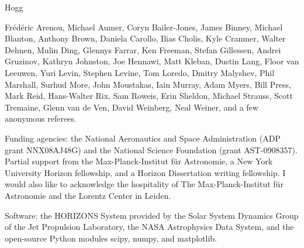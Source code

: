 

Hogg

Fr{\'e}d{\'e}ric Arenou, Michael Aumer, Coryn Bailer-Jones, James
Binney, Michael Blanton, Anthony Brown, Daniela Carollo, Ilias Cholis,
Kyle Cranmer, Walter Dehnen, Mulin Ding, Glennys Farrar, Ken Freeman,
Stefan Gillessen, Andrei Gruzinov, Kathryn Johnston, Joe Hennawi, Matt
Kleban, Dustin Lang, Floor van Leeuwen, Yuri Levin, Stephen Levine,
Tom Loredo, Dmitry Malyshev, Phil Marshall, Surhud More, John
Moustakas, Iain Murray, Adam Myers, Bill Press, Mark Reid, Hans-Walter
Rix, Sam Roweis, Erin Sheldon, Michael Strauss, Scott Tremaine, Glenn
van de Ven, David Weinberg, Neal Weiner, and a few anonymous referees.

Funding agencies: the National Aeronautics and Space Administration
(ADP grant NNX08AJ48G) and the National Science Foundation (grant
AST-0908357). Partial support from the Max-Planck-Institut f\"ur
Astronomie, a New York University Horizon fellowship, and a Horizon
Dissertation writing fellowship. I would also like to acknowledge the
hospitality of The Max-Planck-Institut f\"ur Astronomie and the
Lorentz Center in Leiden.

Software: the HORIZONS System provided by the Solar System Dynamics
Group of the Jet Propulsion Laboratory, the NASA Astrophysics Data
System, and the open-source Python modules scipy, numpy, and
matplotlib.



